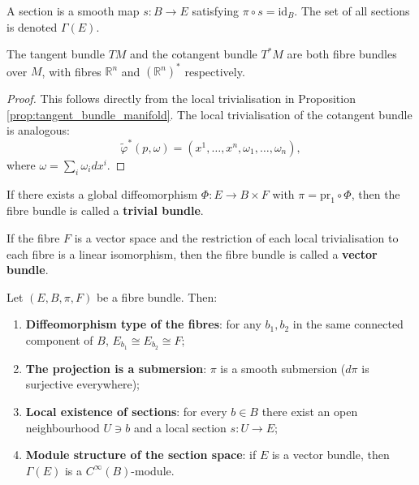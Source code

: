 \begin{definition}\label{def:fibre_bundle_section}
A section is a smooth map $s: B \to E$ satisfying $\pi \circ s = \text{id}_B$. The set of all sections is denoted $\Gamma(E)$.
\end{definition}

\begin{proposition}\label{prop:tangent_cotangent_bundles}
The tangent bundle $TM$ and the cotangent bundle $T^*M$ are both fibre bundles over $M$, with fibres $\mathbb{R}^n$ and $(\mathbb{R}^n)^*$ respectively.
\end{proposition}

\begin{proof}
This follows directly from the local trivialisation in Proposition \ref{prop:tangent_bundle_manifold}.
The local trivialisation of the cotangent bundle is analogous:
\[
\tilde{\varphi}^*(p, \omega)
= (x^1, \dots, x^n, \omega_1, \dots, \omega_n),
\]
where $\omega = \sum_i \omega_i dx^i$.
\end{proof}

\begin{definition}\label{def:trivial_bundle}
If there exists a global diffeomorphism $\Phi: E \to B \times F$ with $\pi = \text{pr}_1 \circ \Phi$, then the fibre bundle is called a \textbf{trivial bundle}.
\end{definition}

\begin{definition}\label{def:vector_bundle}
If the fibre $F$ is a vector space and the restriction of each local trivialisation to each fibre is a linear isomorphism, then the fibre bundle is called a \textbf{vector bundle}.
\end{definition}

\begin{property}\label{prop:fibre_bundle_properties}
Let $(E, B, \pi, F)$ be a fibre bundle. Then:
\begin{enumerate}[label=(\roman*)]
    \item \textbf{Diffeomorphism type of the fibres}: for any $b_1, b_2$ in the same connected component of $B$, $E_{b_1} \cong E_{b_2} \cong F$;
    \item \textbf{The projection is a submersion}: $\pi$ is a smooth submersion ($d\pi$ is surjective everywhere);
    \item \textbf{Local existence of sections}: for every $b \in B$ there exist an open neighbourhood $U \ni b$ and a local section $s: U \to E$;
    \item \textbf{Module structure of the section space}: if $E$ is a vector bundle, then $\Gamma(E)$ is a $C^\infty(B)$-module.
\end{enumerate}
\end{property}

